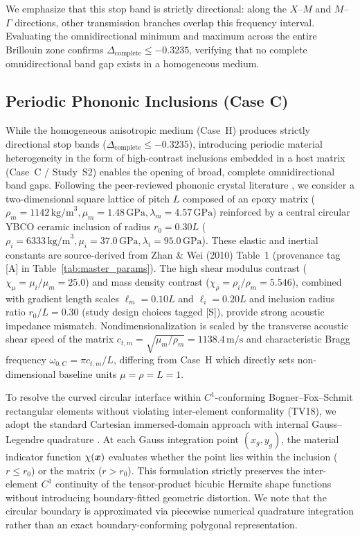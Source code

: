 We emphasize that this stop band is strictly directional: along the $X$--$M$ and $M$--$\Gamma$ directions, other transmission branches overlap this frequency interval. Evaluating the omnidirectional minimum and maximum across the entire Brillouin zone confirms $\Delta_{\mathrm{complete}} \le -0.3235$, verifying that no complete omnidirectional band gap exists in a homogeneous medium.

\subsection{Periodic Phononic Inclusions (Case C)}
\label{sec:caseC_pc}
While the homogeneous anisotropic medium (Case~H) produces strictly directional stop bands ($\Delta_{\mathrm{complete}} \le -0.3235$), introducing periodic material heterogeneity in the form of high-contrast inclusions embedded in a host matrix (Case~C / Study~S2) enables the opening of broad, complete omnidirectional band gaps. Following the peer-reviewed phononic crystal literature \cite{zhanwei2010}, we consider a two-dimensional square lattice of pitch $L$ composed of an epoxy matrix ($\rho_m = 1142\,\mathrm{kg/m}^3, \mu_m = 1.48\,\mathrm{GPa}, \lambda_m = 4.57\,\mathrm{GPa}$) reinforced by a central circular YBCO ceramic inclusion of radius $r_0 = 0.30 L$ ($\rho_i = 6333\,\mathrm{kg/m}^3, \mu_i = 37.0\,\mathrm{GPa}, \lambda_i = 95.0\,\mathrm{GPa}$). These elastic and inertial constants are source-derived from Zhan \& Wei (2010) Table~1 \cite{zhanwei2010} (provenance tag [A] in Table~\ref{tab:master_params}). The high shear modulus contrast ($\chi_\mu = \mu_i/\mu_m = 25.0$) and mass density contrast ($\chi_\rho = \rho_i/\rho_m = 5.546$), combined with gradient length scales $\ell_m = 0.10 L$ and $\ell_i = 0.20 L$ and inclusion radius ratio $r_0/L = 0.30$ (study design choices tagged [S]), provide strong acoustic impedance mismatch. Nondimensionalization is scaled by the transverse acoustic shear speed of the matrix $c_{t,m} = \sqrt{\mu_m/\rho_m} = 1138.4\,\mathrm{m/s}$ and characteristic Bragg frequency $\omega_{0,\mathrm{C}} = \pi c_{t,m} / L$, differing from Case~H which directly sets non-dimensional baseline units $\mu = \rho = L = 1$.

To resolve the curved circular interface within $C^1$-conforming Bogner--Fox--Schmit rectangular elements without violating inter-element conformality (TV18), we adopt the standard Cartesian immersed-domain approach with internal Gauss--Legendre quadrature \cite{bfs1965}. At each Gauss integration point $(x_g, y_g)$, the material indicator function $\chi(\bm{x})$ evaluates whether the point lies within the inclusion ($r \le r_0$) or the matrix ($r > r_0$). This formulation strictly preserves the inter-element $C^1$ continuity of the tensor-product bicubic Hermite shape functions without introducing boundary-fitted geometric distortion. We note that the circular boundary is approximated via piecewise numerical quadrature integration rather than an exact boundary-conforming polygonal representation.

